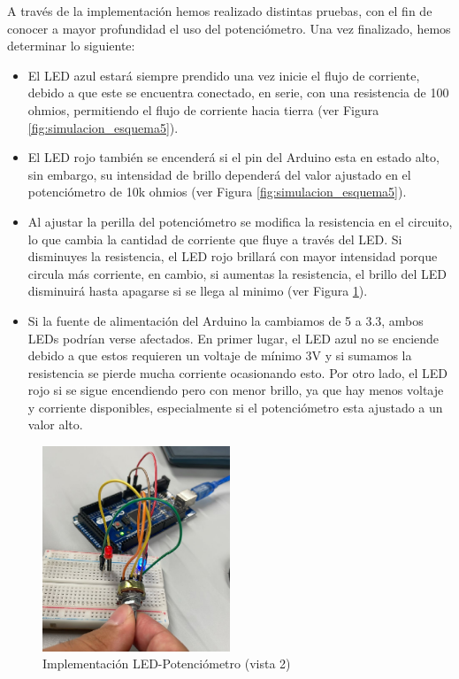 \documentclass{article}
\begin{document}
A través de la implementación hemos realizado distintas pruebas, con el fin de conocer a mayor profundidad el uso del potenciómetro. Una vez finalizado, hemos determinar lo siguiente:
\begin{itemize}
    \item El LED azul estará siempre prendido una vez inicie el flujo de corriente, debido a que este se encuentra conectado, en serie, con una resistencia de 100 ohmios, permitiendo el flujo de corriente hacia tierra (ver Figura \ref{fig:simulacion_esquema5}).
    \item El LED rojo también se encenderá si el pin del Arduino esta en estado alto, sin embargo, su intensidad de brillo dependerá del valor ajustado en el potenciómetro de 10k ohmios (ver Figura \ref{fig:simulacion_esquema5}).
    \item Al ajustar la perilla del potenciómetro se modifica la resistencia en el circuito, lo que cambia la cantidad de corriente que fluye a través del LED. Si disminuyes la resistencia, el LED rojo brillará con mayor intensidad porque circula más corriente, en cambio, si aumentas la resistencia, el brillo del LED disminuirá hasta apagarse si se llega al minimo (ver Figura \ref{fig:simulacion_esquema6}).
    \item Si la fuente de alimentación del Arduino la cambiamos de 5 a 3.3, ambos LEDs podrían verse afectados. En primer lugar, el LED azul no se enciende debido a que estos requieren un voltaje de mínimo 3V y si sumamos la resistencia se pierde mucha corriente ocasionando esto. Por otro lado, el LED rojo si se sigue encendiendo pero con menor brillo, ya que hay menos voltaje y corriente disponibles, especialmente si el potenciómetro esta ajustado a un valor alto.
\end{itemize}

\begin{figure}[H]
    \centering
    \includegraphics[width=0.50\textwidth]{./img/ckpt_3_4_1.png}
    \caption{Implementación LED-Potenciómetro (vista 2)}
    \label{fig:simulacion_esquema6}
\end{figure}
\end{document}
